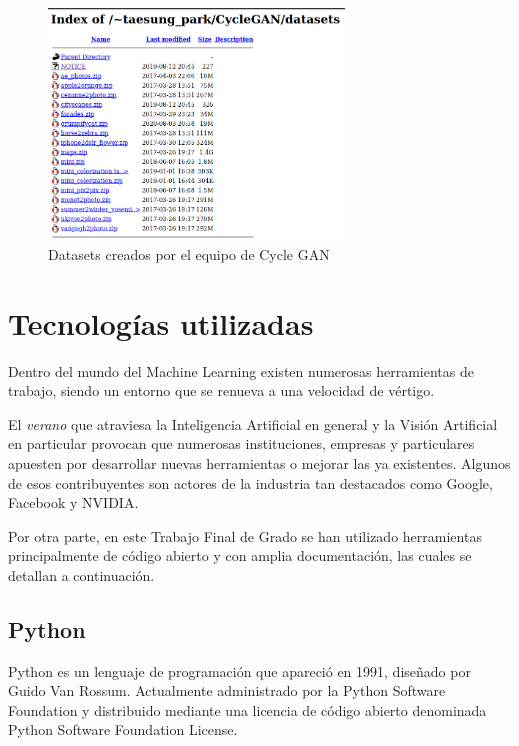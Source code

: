 \documentclass[../main.tex]{subfiles}
\begin{document}
\begin{figure}[h]
    \centering
    \includegraphics[width=0.7\textwidth]{imagenes/datasets_berkeley.png}
    \caption{Datasets creados por el equipo de Cycle GAN}
    \label{fig:datasets:berkeley}
\end{figure}

\section{Tecnologías utilizadas}
Dentro del mundo del Machine Learning existen numerosas herramientas de trabajo, siendo un entorno que se renueva a una velocidad de vértigo. \newline

El \textit{verano} que atraviesa la Inteligencia Artificial en general y la Visión Artificial en particular provocan que numerosas instituciones, empresas y particulares apuesten por desarrollar nuevas herramientas o mejorar las ya existentes. Algunos de esos contribuyentes son actores de la industria tan destacados como Google, Facebook y NVIDIA.
\newline

Por otra parte, en este Trabajo Final de Grado se han utilizado herramientas principalmente de código abierto y con amplia documentación, las cuales se detallan a continuación.
\subsection{Python}
Python es un lenguaje de programación que apareció en 1991, diseñado por Guido Van Rossum. Actualmente administrado por la Python Software Foundation y distribuido mediante una licencia de código abierto denominada Python Software Foundation License. \newline
\end{document}
